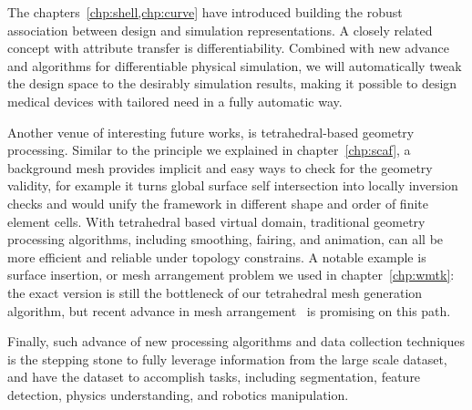 The chapters~\ref{chp:shell,chp:curve} have introduced building the robust association between design and simulation representations. A closely related concept with attribute transfer is differentiability. Combined with new advance and algorithms for differentiable physical simulation, we will automatically tweak the design space to the desirably simulation results, making it possible to design medical devices with tailored need in a fully automatic way.

Another venue of interesting future works, is tetrahedral-based geometry processing. Similar to the principle we explained in chapter~\ref{chp:scaf}, a background mesh provides implicit and easy ways to check for the geometry validity, for example it turns global surface self intersection into locally inversion checks and would unify the framework in different shape and order of finite element cells. With tetrahedral based virtual domain, traditional geometry processing algorithms, including smoothing, fairing, and animation, can all be more efficient and reliable under topology constrains. A notable example is surface insertion, or mesh arrangement problem we used in chapter~\ref{chp:wmtk}: the exact version is still the bottleneck of our tetrahedral mesh generation algorithm, but recent advance in mesh arrangement~\cite{Hu:2019:fTetWild,zhou2016mesh,ember2022} is promising on this path.

Finally, such advance of new processing algorithms and data collection techniques is the stepping stone to fully leverage information from the large scale dataset\cite{Koch_2019_CVPR,zhou2016thingi10k}, and have the dataset to accomplish tasks, including segmentation, feature detection, physics understanding, and robotics manipulation.
